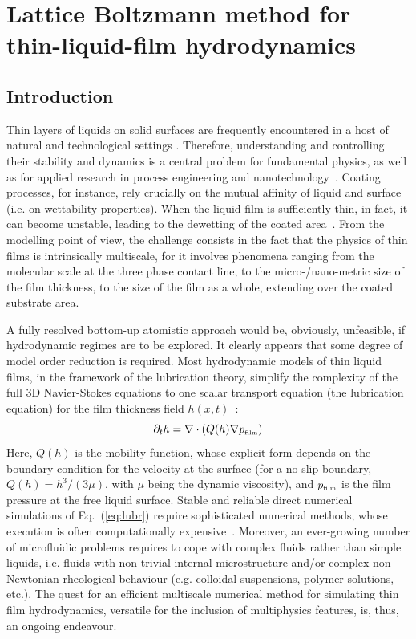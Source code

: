 \chapter{Lattice Boltzmann method for thin-liquid-film hydrodynamics}
\label{chapter:first_paper}

\section{Introduction}
Thin layers of liquids on solid surfaces are frequently encountered in a host
of natural and technological settings \cite{de2003capillarity,Focke}. Therefore,
understanding and controlling their stability and dynamics is a central problem
for fundamental physics, as well as for applied research in process engineering
and nanotechnology~\cite{RevModPhys.69.931,Utada}. Coating processes, for instance,
rely crucially on the mutual affinity of liquid and surface (i.e. on
wettability properties). When the liquid film is sufficiently thin, in fact, it
can become unstable, leading to the dewetting of the coated
area~\cite{RevModPhys.81.739}. From the modelling point of view, the challenge
consists in the fact that the physics of thin films is intrinsically
multiscale, for it involves phenomena ranging from the molecular scale 
at the three phase contact line, to the micro-/nano-metric size of the 
film thickness, to the size of the film as a whole, extending over the coated substrate area.

A fully resolved bottom-up atomistic
approach would be, obviously, unfeasible, if hydrodynamic regimes are to be
explored. It clearly appears that some degree of model order reduction is required. Most hydrodynamic models of thin liquid films, in the framework of the
lubrication theory, simplify the complexity of the full 3D Navier-Stokes
equations \cite{Navier,Stokes}
to one scalar transport equation (the lubrication equation) for the film thickness field
$h(x,t)$~\cite{ReynoldsLubr,RevModPhys.69.931,RevModPhys.81.1131,Mitlin}:
\begin{equation}\label{eq:lubr}
    \partial_t h = \nabla \cdot \left(Q(h)\nabla p_{\mbox{\tiny{film}}}\right)
\end{equation}
Here, $Q(h)$ is the mobility function, whose explicit form depends on the
boundary condition for the velocity at the surface (for a no-slip boundary, $Q(h) = h^3/(3 \mu)$, with
$\mu$ being the dynamic viscosity), and $p_{\mbox{\tiny{film}}}$ is the film
pressure at the free liquid surface.
Stable and reliable direct numerical simulations of Eq.~(\ref{eq:lubr}) require sophisticated numerical methods, whose execution is often computationally expensive~\cite{becker2003complex}.
Moreover, an ever-growing number of microfluidic problems requires to cope with
complex fluids rather than simple liquids, i.e. fluids with non-trivial
internal microstructure and/or complex non-Newtonian rheological
behaviour (e.g. colloidal suspensions, polymer solutions, etc.). 
The quest for an efficient multiscale numerical
method for simulating thin film hydrodynamics, versatile for the inclusion of
multiphysics features, is, thus, an ongoing endeavour. 

